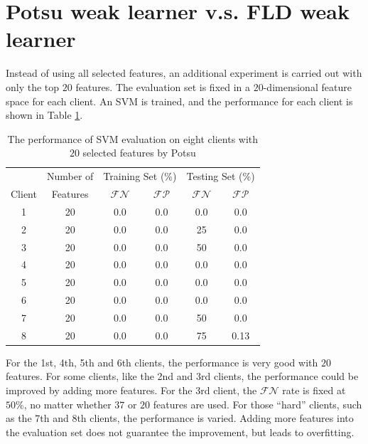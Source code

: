 \section{Potsu weak learner v.s. FLD weak learner}
\label{sec:potsuvsfld}
Instead of using all selected features, an additional experiment is carried out with only the top $20$ features. The evaluation set is fixed in a $20$-dimensional feature space for each client. An SVM is trained, and the performance for each client is shown in \mbox{Table} \ref{tab:svmevaluation20}.
\begin{table}[ht]
\caption{The performance of SVM evaluation on eight clients with $20$ selected features by Potsu}
 \begin{center}
   \begin{tabular}{|c|c|c|c|c|c|}
  \hline
    & Number of& \multicolumn{2}{c|}{Training Set (\%)} & \multicolumn{2}{c|}{Testing Set (\%)}\\
   \cline{3-6}
  Client & Features & $\mathcal{FN}$ & $\mathcal{FP}$ & $\mathcal{FN}$ & $\mathcal{FP}$ \\
  \hline
  1 & 20 & 0.0 & 0.0 & 0.0 & 0.0\\
  2 & 20 & 0.0 & 0.0 & 25 & 0.0\\
  3 & 20 & 0.0 & 0.0 & 50 & 0.0\\
  4 & 20 & 0.0 & 0.0 & 0.0 & 0.0\\
  5 & 20 & 0.0 & 0.0 & 0.0 & 0.0\\
  6 & 20 & 0.0 & 0.0 & 0.0 & 0.0\\
  7 & 20 & 0.0 & 0.0 & 50 & 0.0\\
  8 & 20 & 0.0 & 0.0 & 75 & 0.13\\
  \hline
 \end{tabular}
 \end{center}
\label{tab:svmevaluation20}
\end{table} 
For the 1st, 4th, 5th and 6th clients, the performance is very good with $20$ features. For some clients, like the 2nd and 3rd clients, the performance could be improved by adding more features. For the 3rd client, the $\mathcal{FN}$ rate is fixed at $50\%$, no matter whether $37$ or $20$ features are used. For those ``hard'' clients, such as the 7th and 8th clients, the performance is varied. Adding more features into the evaluation set does not guarantee the improvement, but leads to overfitting.

